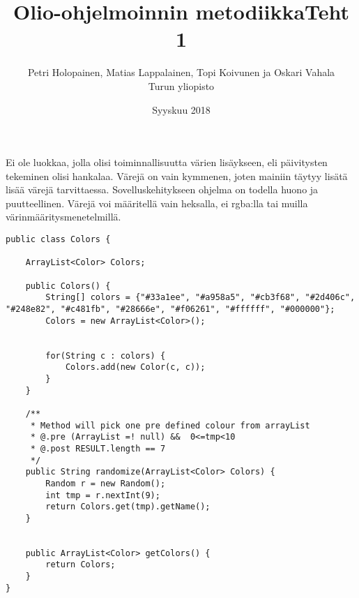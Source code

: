 \documentclass[a4paper,12pt,titlepage]{article}
\title{Olio-ohjelmoinnin metodiikka}
\author{Petri Holopainen, Matias Lappalainen, Topi Koivunen ja Oskari Vahala\\[1cm]
 Turun yliopisto}
\date{Syyskuu 2018}
\theoremstyle{definition}
\theoremstyle{remark}
\begin{document}
\maketitle          %


\section{}

Ei ole luokkaa, jolla olisi toiminnallisuutta värien lisäykseen, eli päivitysten tekeminen olisi hankalaa. Värejä on vain kymmenen, joten mainiin täytyy lisätä lisää värejä tarvittaessa. Sovelluskehitykseen ohjelma on todella huono ja puutteellinen. Värejä voi määritellä vain heksalla, ei rgba:lla tai muilla värinmääritysmenetelmillä.


\renewcommand{\refname}{Kirjallisuutta} %

\newpage

\title{Teht 1}
\begin{lstlisting}
public class Colors {

    ArrayList<Color> Colors;

    public Colors() {
        String[] colors = {"#33a1ee", "#a958a5", "#cb3f68", "#2d406c", "#248e82", "#c481fb", "#28666e", "#f06261", "#ffffff", "#000000"};
        Colors = new ArrayList<Color>();


        for(String c : colors) {
            Colors.add(new Color(c, c));
        }
    }

    /**
     * Method will pick one pre defined colour from arrayList
     * @.pre (ArrayList =! null) &&  0<=tmp<10
     * @.post RESULT.length == 7
     */
    public String randomize(ArrayList<Color> Colors) {
        Random r = new Random();
        int tmp = r.nextInt(9);
        return Colors.get(tmp).getName();
    }


    public ArrayList<Color> getColors() {
        return Colors;
    }
}
\end{lstlisting}

\newpage
\end{document}

